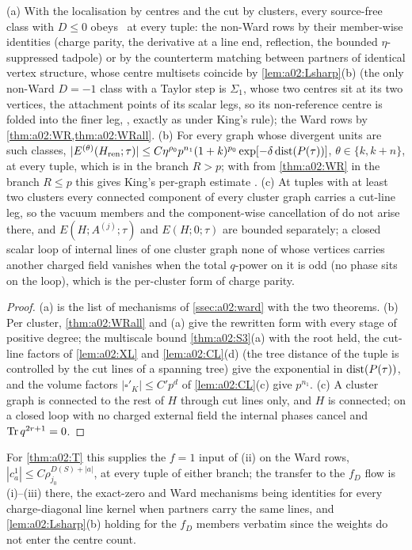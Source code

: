 \begin{corollary}\label{cor:a02:DEGall}
\textup{(a)} With the localisation by centres and the cut by clusters, every source-free class with $D\le0$ obeys \DEG\ at every tuple: the non-Ward rows by their member-wise identities (charge parity, the derivative at a line end, reflection, the bounded $\eta$-suppressed tadpole) or by the counterterm matching between partners of identical vertex structure, whose centre multisets coincide by \cref{lem:a02:Lsharp}(b) (the only non-Ward $D=-1$ class with a Taylor step is $\Sigma_1$, whose two centres sit at its two vertices, the attachment points of its scalar legs, so its non-reference centre is folded into the finer leg, \cite[(3.85)]{K1}, exactly as under King's rule); the Ward rows by \cref{thm:a02:WR,thm:a02:WRall}. \textup{(b)} For every graph whose divergent units are such classes, $|E^{(\theta)}(H_{\mathrm{ren}};\tau)|\le C\eta^{\rho_0}p^{n_1}(1+k)^{p_0}\exp[-\delta\operatorname{dist}(P(\tau))]$, $\theta\in\{k,k+n\}$, at every tuple, which is \cite[(3.38)]{K1} in the branch $R>p$; with \cite[(3.39)]{K1} from \cref{thm:a02:WR} in the branch $R\le p$ this gives King's per-graph estimate \cite[(3.42)]{K1}. \textup{(c)} At tuples with at least two clusters every connected component of every cluster graph carries a cut-line leg, so the vacuum members and the component-wise cancellation of \cite[p.~667]{K1} do not arise there, and $E(H;A^{(j)};\tau)$ and $E(H;0;\tau)$ are bounded separately; a closed scalar loop of internal lines of one cluster graph none of whose vertices carries another charged field vanishes when the total $q$-power on it is odd (no phase sits on the loop), which is the per-cluster form of charge parity.
\end{corollary}
\begin{proof}
(a) is the list of mechanisms of \cref{ssec:a02:ward} with the two theorems. (b) Per cluster, \cref{thm:a02:WRall} and (a) give the rewritten form with every stage of positive degree; the multiscale bound \cref{thm:a02:S3}(a) with the root held, the cut-line factors of \cref{lem:a02:XL} and \cref{lem:a02:CL}(d) (the tree distance of the tuple is controlled by the cut lines of a spanning tree) give the exponential in $\operatorname{dist}(P(\tau))$, and the volume factors $|\square'_K|\le C'p^d$ of \cref{lem:a02:CL}(c) give $p^{n_1}$. (c) A cluster graph is connected to the rest of $H$ through cut lines only, and $H$ is connected; on a closed loop with no charged external field the internal phases cancel and $\operatorname{Tr} q^{2r+1}=0$.
\end{proof}

For \cref{thm:a02:T} this supplies the $f=1$ input of (ii) on the Ward rows, $|c_a^1|\le C\rho_{j_0}^{D(S)+|a|}$, at every tuple of either branch; the transfer to the $f_D$ flow is (i)--(iii) there, the exact-zero and Ward mechanisms being identities for every charge-diagonal line kernel when partners carry the same lines, and \cref{lem:a02:Lsharp}(b) holding for the $f_D$ members verbatim since the weights do not enter the centre count.
